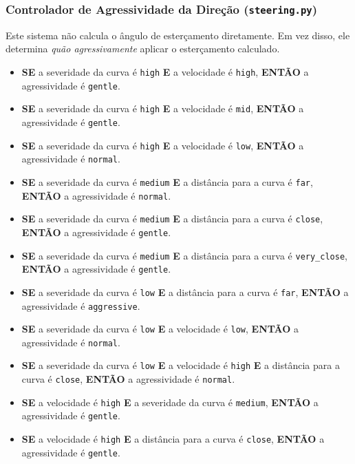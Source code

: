 \documentclass[12pt]{article}
\begin{document}
\subsubsection{Controlador de Agressividade da Direção (\texttt{steering.py})}
Este sistema não calcula o ângulo de esterçamento diretamente. Em vez disso, ele determina \emph{quão agressivamente} aplicar o esterçamento calculado.
\begin{itemize}[label=\textbullet, leftmargin=*]
    \item \textbf{SE} a severidade da curva é \texttt{high} \textbf{E} a velocidade é \texttt{high}, \textbf{ENTÃO} a agressividade é \texttt{gentle}.
    \item \textbf{SE} a severidade da curva é \texttt{high} \textbf{E} a velocidade é \texttt{mid}, \textbf{ENTÃO} a agressividade é \texttt{gentle}.
    \item \textbf{SE} a severidade da curva é \texttt{high} \textbf{E} a velocidade é \texttt{low}, \textbf{ENTÃO} a agressividade é \texttt{normal}.
    \item \textbf{SE} a severidade da curva é \texttt{medium} \textbf{E} a distância para a curva é \texttt{far}, \textbf{ENTÃO} a agressividade é \texttt{normal}.
    \item \textbf{SE} a severidade da curva é \texttt{medium} \textbf{E} a distância para a curva é \texttt{close}, \textbf{ENTÃO} a agressividade é \texttt{gentle}.
    \item \textbf{SE} a severidade da curva é \texttt{medium} \textbf{E} a distância para a curva é \texttt{very\_close}, \textbf{ENTÃO} a agressividade é \texttt{gentle}.
    \item \textbf{SE} a severidade da curva é \texttt{low} \textbf{E} a distância para a curva é \texttt{far}, \textbf{ENTÃO} a agressividade é \texttt{aggressive}.
    \item \textbf{SE} a severidade da curva é \texttt{low} \textbf{E} a velocidade é \texttt{low}, \textbf{ENTÃO} a agressividade é \texttt{normal}.
    \item \textbf{SE} a severidade da curva é \texttt{low} \textbf{E} a velocidade é \texttt{high} \textbf{E} a distância para a curva é \texttt{close}, \textbf{ENTÃO} a agressividade é \texttt{normal}.
    \item \textbf{SE} a velocidade é \texttt{high} \textbf{E} a severidade da curva é \texttt{medium}, \textbf{ENTÃO} a agressividade é \texttt{gentle}.
    \item \textbf{SE} a velocidade é \texttt{high} \textbf{E} a distância para a curva é \texttt{close}, \textbf{ENTÃO} a agressividade é \texttt{gentle}.
\end{itemize}
\end{document}
